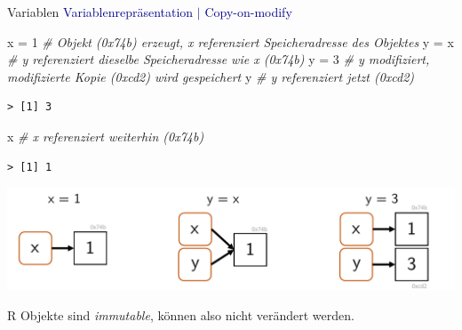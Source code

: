 \documentclass[
  8pt,
  ignorenonframetext,
]{beamer}
\newenvironment{Shaded}{\begin{snugshade}}{\end{snugshade}}
\newcommand{\CommentTok}[1]{\textcolor[rgb]{0.56,0.35,0.01}{\textit{#1}}}
\newcommand{\DecValTok}[1]{\textcolor[rgb]{0.00,0.00,0.81}{#1}}
\newcommand{\NormalTok}[1]{#1}
\newcommand{\OtherTok}[1]{\textcolor[rgb]{0.56,0.35,0.01}{#1}}
\begin{document}
\begin{frame}[fragile]{Variablen}
\protect\hypertarget{variablen-7}{}
\textcolor{darkblue}{Variablenrepräsentation $\vert$ Copy-on-modify}
\vspace{2mm} \small

\begin{Shaded}
\begin{Highlighting}[]
\NormalTok{x }\OtherTok{=} \DecValTok{1}       \CommentTok{\# Objekt (0x74b) erzeugt, x referenziert Speicheradresse  des Objektes}
\NormalTok{y }\OtherTok{=}\NormalTok{ x       }\CommentTok{\# y referenziert dieselbe Speicheradresse wie x (0x74b)}
\NormalTok{y }\OtherTok{=} \DecValTok{3}       \CommentTok{\# y modifiziert, modifizierte Kopie (0xcd2) wird gespeichert}
\NormalTok{y           }\CommentTok{\# y referenziert jetzt (0xcd2)}
\end{Highlighting}
\end{Shaded}

\begin{verbatim}
> [1] 3
\end{verbatim}

\begin{Shaded}
\begin{Highlighting}[]
\NormalTok{x           }\CommentTok{\# x referenziert weiterhin (0x74b)}
\end{Highlighting}
\end{Shaded}

\begin{verbatim}
> [1] 1
\end{verbatim}

\begin{center}\includegraphics[width=0.7\linewidth]{2_Abbildungen/pds_2_copy_on_modify} \end{center}

R Objekte sind \textit{immutable}, können also nicht verändert werden.
\end{frame}
\end{document}
